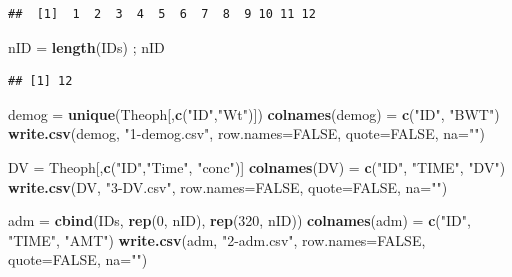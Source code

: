 \documentclass[10pt,]{krantz}
\makeatletter
\newenvironment{Shaded}{\begin{snugshade}}{\end{snugshade}}
\newcommand{\KeywordTok}[1]{\textcolor[rgb]{0.13,0.29,0.53}{\textbf{#1}}}
\newcommand{\DataTypeTok}[1]{\textcolor[rgb]{0.13,0.29,0.53}{#1}}
\newcommand{\DecValTok}[1]{\textcolor[rgb]{0.00,0.00,0.81}{#1}}
\newcommand{\StringTok}[1]{\textcolor[rgb]{0.31,0.60,0.02}{#1}}
\newcommand{\OtherTok}[1]{\textcolor[rgb]{0.56,0.35,0.01}{#1}}
\newcommand{\NormalTok}[1]{#1}
\newenvironment{kframe}{%
\medskip{}
\setlength{\fboxsep}{.8em}
 \def\at@end@of@kframe{}%
 \ifinner\ifhmode%
  \def\at@end@of@kframe{\end{minipage}}%
  \begin{minipage}{\columnwidth}%
 \fi\fi%
 \def\FrameCommand##1{\hskip\@totalleftmargin \hskip-\fboxsep
 \colorbox{shadecolor}{##1}\hskip-\fboxsep
     \hskip-\linewidth \hskip-\@totalleftmargin \hskip\columnwidth}%
 \MakeFramed {\advance\hsize-\width
   \@totalleftmargin\z@ \linewidth\hsize
   \@setminipage}}%
 {\par\unskip\endMakeFramed%
 \at@end@of@kframe}
\renewenvironment{Shaded}{\begin{kframe}}{\end{kframe}}
\makeatother
\begin{document}
\begin{verbatim}
##  [1]  1  2  3  4  5  6  7  8  9 10 11 12
\end{verbatim}

\begin{Shaded}
\begin{Highlighting}[]
\NormalTok{nID =}\StringTok{ }\KeywordTok{length}\NormalTok{(IDs) ; nID}
\end{Highlighting}
\end{Shaded}

\begin{verbatim}
## [1] 12
\end{verbatim}

\begin{Shaded}
\begin{Highlighting}[]
\NormalTok{demog =}\StringTok{ }\KeywordTok{unique}\NormalTok{(Theoph[,}\KeywordTok{c}\NormalTok{(}\StringTok{"ID"}\NormalTok{,}\StringTok{"Wt"}\NormalTok{)])}
\KeywordTok{colnames}\NormalTok{(demog) =}\StringTok{ }\KeywordTok{c}\NormalTok{(}\StringTok{"ID"}\NormalTok{, }\StringTok{"BWT"}\NormalTok{)}
\KeywordTok{write.csv}\NormalTok{(demog, }\StringTok{"1-demog.csv"}\NormalTok{, }\DataTypeTok{row.names=}\OtherTok{FALSE}\NormalTok{, }\DataTypeTok{quote=}\OtherTok{FALSE}\NormalTok{, }\DataTypeTok{na=}\StringTok{""}\NormalTok{)}

\NormalTok{DV =}\StringTok{ }\NormalTok{Theoph[,}\KeywordTok{c}\NormalTok{(}\StringTok{"ID"}\NormalTok{,}\StringTok{"Time"}\NormalTok{, }\StringTok{"conc"}\NormalTok{)]}
\KeywordTok{colnames}\NormalTok{(DV) =}\StringTok{ }\KeywordTok{c}\NormalTok{(}\StringTok{"ID"}\NormalTok{, }\StringTok{"TIME"}\NormalTok{, }\StringTok{"DV"}\NormalTok{)}
\KeywordTok{write.csv}\NormalTok{(DV, }\StringTok{"3-DV.csv"}\NormalTok{, }\DataTypeTok{row.names=}\OtherTok{FALSE}\NormalTok{, }\DataTypeTok{quote=}\OtherTok{FALSE}\NormalTok{, }\DataTypeTok{na=}\StringTok{""}\NormalTok{)}

\NormalTok{adm =}\StringTok{ }\KeywordTok{cbind}\NormalTok{(IDs, }\KeywordTok{rep}\NormalTok{(}\DecValTok{0}\NormalTok{, nID), }\KeywordTok{rep}\NormalTok{(}\DecValTok{320}\NormalTok{, nID))}
\KeywordTok{colnames}\NormalTok{(adm) =}\StringTok{ }\KeywordTok{c}\NormalTok{(}\StringTok{"ID"}\NormalTok{, }\StringTok{"TIME"}\NormalTok{, }\StringTok{"AMT"}\NormalTok{)}
\KeywordTok{write.csv}\NormalTok{(adm, }\StringTok{"2-adm.csv"}\NormalTok{, }\DataTypeTok{row.names=}\OtherTok{FALSE}\NormalTok{, }\DataTypeTok{quote=}\OtherTok{FALSE}\NormalTok{, }\DataTypeTok{na=}\StringTok{""}\NormalTok{)}


\end{Highlighting}
\end{Shaded}
\end{document}
